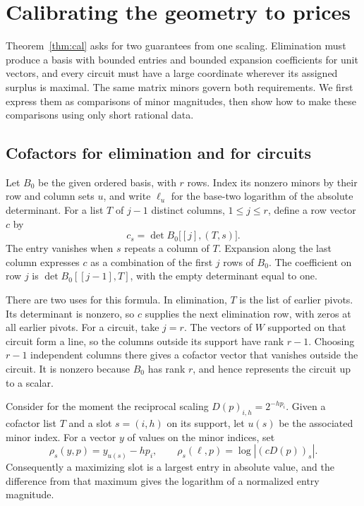 \section{Calibrating the geometry to prices}\label{sec:calibration}

Theorem~\ref{thm:cal} asks for two guarantees from one scaling.
Elimination must produce a basis with bounded entries and bounded
expansion coefficients for unit vectors, and every
circuit must have a large coordinate wherever its assigned surplus is
maximal. The same matrix minors govern both requirements. We first
express them as comparisons of minor magnitudes, then show how to make
these comparisons using only short rational data.

\subsection{Cofactors for elimination and for circuits}

Let \(B_0\) be the given ordered basis, with \(r\) rows. Index its
nonzero minors by their row and column sets \(u\), and write \(\ell_u\)
for the base-two logarithm of the absolute determinant. For a list
\(T\) of \(j-1\) distinct columns, \(1\le j\le r\), define a row
vector \(c\) by
\begin{equation}\label{eq:cofactor}
 c_s=\det B_0\big[[j],(T,s)\big].
\end{equation}
The entry vanishes when \(s\) repeats a column of \(T\). Expansion
along the last column expresses \(c\) as a combination of the first
\(j\) rows of \(B_0\). The coefficient on row \(j\) is
\(\det B_0[[j-1],T]\), with the empty determinant equal to one.

There are two uses for this formula. In elimination, \(T\) is the
list of earlier pivots. Its determinant is nonzero, so \(c\) supplies
the next elimination row, with zeros at all earlier pivots. For a
circuit, take \(j=r\). The vectors of \(W\) supported on that circuit
form a line, so the columns outside its support have rank \(r-1\).
Choosing \(r-1\) independent columns there gives a cofactor vector
that vanishes outside the circuit. It is nonzero because \(B_0\) has
rank \(r\), and hence represents the circuit up to a scalar.

Consider for the moment the reciprocal scaling
\(D(p)_{i,h}=2^{-hp_i}\). Given a cofactor list \(T\) and a slot
\(s=(i,h)\) on its support, let \(u(s)\) be the associated minor
index. For a vector \(y\) of values on the minor indices, set
\begin{equation}\label{eq:rho}
 \rho_s(y,p)=y_{u(s)}-hp_i,\qquad
 \rho_s(\ell,p)=\log |(cD(p))_s|.
\end{equation}
Consequently a maximizing slot is a largest entry in absolute value,
and the difference from that maximum gives the logarithm of a
normalized entry magnitude.

